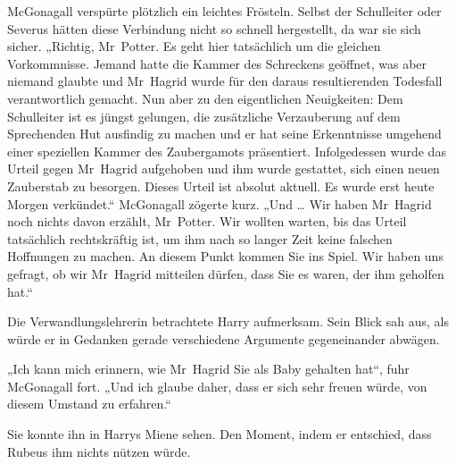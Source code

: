 McGonagall verspürte plötzlich ein leichtes Frösteln. Selbst der Schulleiter oder Severus hätten diese Verbindung nicht so schnell hergestellt, da war sie sich sicher.
„Richtig, Mr~Potter. Es geht hier tatsächlich um die gleichen Vorkommnisse. Jemand hatte die Kammer des Schreckens geöffnet, was aber niemand glaubte und Mr~Hagrid wurde für den daraus resultierenden Todesfall verantwortlich gemacht. Nun aber zu den eigentlichen Neuigkeiten: Dem Schulleiter ist es jüngst gelungen, die zusätzliche Verzauberung auf dem Sprechenden Hut ausfindig zu machen und er hat seine Erkenntnisse umgehend einer speziellen Kammer des Zaubergamots präsentiert. Infolgedessen wurde das Urteil gegen Mr~Hagrid aufgehoben und ihm wurde gestattet, sich einen neuen Zauberstab zu besorgen. Dieses Urteil ist absolut aktuell. Es wurde erst heute Morgen verkündet.“ McGonagall zögerte kurz.
„Und … Wir haben Mr~Hagrid noch nichts davon erzählt, Mr~Potter. Wir wollten warten, bis das Urteil tatsächlich rechtskräftig ist, um ihm nach so langer Zeit keine falschen Hoffnungen zu machen. An diesem Punkt kommen Sie ins Spiel. Wir haben uns gefragt, ob wir Mr~Hagrid mitteilen dürfen, dass Sie es waren, der ihm geholfen hat.“

Die Verwandlungslehrerin betrachtete Harry aufmerksam. Sein Blick sah aus, als würde er in Gedanken gerade verschiedene Argumente gegeneinander abwägen.

„Ich kann mich erinnern, wie Mr~Hagrid Sie als Baby gehalten hat“, fuhr McGonagall fort.
„Und ich glaube daher, dass er sich sehr freuen würde, von diesem Umstand zu erfahren.“

Sie konnte ihn in Harrys Miene sehen. Den Moment, indem er entschied, dass Rubeus ihm nichts nützen würde.

